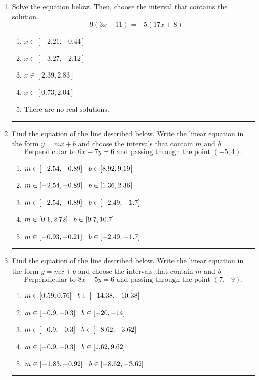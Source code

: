 \documentclass[14pt]{extbook}
\newcommand{\litem}[1]{\item#1\hspace*{-1cm}\rule{\textwidth}{0.4pt}}
\begin{document}
\begin{enumerate}
\litem{
Solve the equation below. Then, choose the interval that contains the solution.\[ -9(3x + 11) = -5(17x + 8) \]\begin{enumerate}[label=\Alph*.]
\item \( x \in [-2.21, -0.44] \)
\item \( x \in [-3.27, -2.12] \)
\item \( x \in [2.39, 2.83] \)
\item \( x \in [0.73, 2.04] \)
\item \( \text{There are no real solutions.} \)

\end{enumerate} }
\litem{
Find the equation of the line described below. Write the linear equation in the form $ y=mx+b $ and choose the intervals that contain $m$ and $b$.\[ \text{Perpendicular to } 6 x - 7 y = 6 \text{ and passing through the point } (-5, 4). \]\begin{enumerate}[label=\Alph*.]
\item \( m \in [-2.54, -0.89] \hspace*{3mm} b \in [8.92, 9.19] \)
\item \( m \in [-2.54, -0.89] \hspace*{3mm} b \in [1.36, 2.36] \)
\item \( m \in [-2.54, -0.89] \hspace*{3mm} b \in [-2.49, -1.7] \)
\item \( m \in [0.1, 2.72] \hspace*{3mm} b \in [9.7, 10.7] \)
\item \( m \in [-0.93, -0.21] \hspace*{3mm} b \in [-2.49, -1.7] \)

\end{enumerate} }
\litem{
Find the equation of the line described below. Write the linear equation in the form $ y=mx+b $ and choose the intervals that contain $m$ and $b$.\[ \text{Perpendicular to } 8 x - 5 y = 6 \text{ and passing through the point } (7, -9). \]\begin{enumerate}[label=\Alph*.]
\item \( m \in [0.59, 0.76] \hspace*{3mm} b \in [-14.38, -10.38] \)
\item \( m \in [-0.9, -0.3] \hspace*{3mm} b \in [-20, -14] \)
\item \( m \in [-0.9, -0.3] \hspace*{3mm} b \in [-8.62, -3.62] \)
\item \( m \in [-0.9, -0.3] \hspace*{3mm} b \in [1.62, 9.62] \)
\item \( m \in [-1.83, -0.92] \hspace*{3mm} b \in [-8.62, -3.62] \)


\end{enumerate}}
\end{enumerate}
\end{document}
